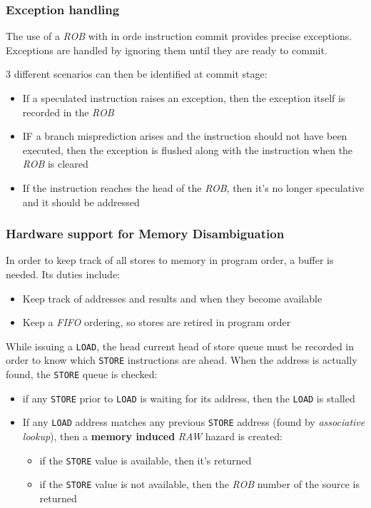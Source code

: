 \documentclass[english]{article}
\begin{document}
\subsubsection{Exception handling}

The use of a \textit{ROB} with in orde instruction commit provides precise exceptions.
Exceptions are handled by ignoring them until they are ready to commit.

3 different scenarios can then be identified at commit stage:

\begin{itemize}
  \item If a speculated instruction raises an exception, then the exception itself is recorded in the \textit{ROB}
  \item IF a branch misprediction arises and the instruction should not have been executed, then the exception is flushed along with the instruction when the \textit{ROB} is cleared
  \item If the instruction reaches the head of the \textit{ROB}, then it's no longer speculative and it should be addressed
\end{itemize}

\subsubsection{Hardware support for Memory Disambiguation}

In order to keep track of all stores to memory in program order, a buffer is needed.
Its duties include:

\begin{itemize}
  \item Keep track of addresses and results and when they become available
  \item Keep a \textit{FIFO} ordering, so stores are retired in program order
\end{itemize}

While issuing a \texttt{LOAD}, the head current head of store queue must be recorded in order to know which \texttt{STORE} instructions are ahead.
When the address is actually found, the \texttt{STORE} queue is checked:

\begin{itemize}
  \item if any \texttt{STORE} prior to \texttt{LOAD} is waiting for its address, then the \texttt{LOAD} is stalled
  \item If any \texttt{LOAD} address matches any previous \texttt{STORE} address (found by \textit{associative lookup}), then a \textbf{memory induced} \textit{RAW} hazard is created:
        \begin{itemize}
          \item if the \texttt{STORE} value is available, then it's returned
          \item if the \texttt{STORE} value is not available, then the \textit{ROB} number of the source is returned
        \end{itemize}
\end{itemize}
\end{document}
